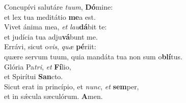 \evenverse Concupívi salutáre \textit{tu}\textit{um}, \textbf{Dó}mine:~\*\\
\evenverse et lex tua meditátio \textbf{me}a est.\\
\oddverse Vivet ánima mea, \textit{et} \textit{lau}\textbf{dá}bit te:~\*\\
\oddverse et judícia tua adju\textbf{vá}bunt me.\\
\evenverse Errávi, sicut o\textit{vis}, \textit{quæ} \textbf{pé}riit:~\*\\
\evenverse quære servum tuum, quia mandáta tua non sum o\textbf{blí}tus.\\
\oddverse Glória Pa\textit{tri}, \textit{et} \textbf{Fí}lio,~\*\\
\oddverse et Spirítui \textbf{San}cto.\\
\evenverse Sicut erat in princípio, et \textit{nunc}, \textit{et} \textbf{sem}per,~\*\\
\evenverse et in sǽcula sæculórum. \textbf{A}men.\\
